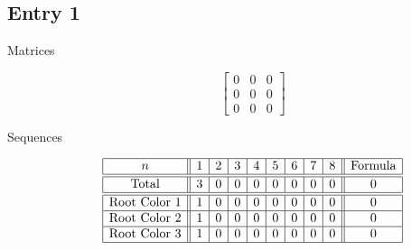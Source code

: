 \documentclass[12pt]{amsart}
\begin{document}
\subsection*{Entry 1}
\begin{description}
    \item[Matrices]
    
    \[\begin{bmatrix}
0 & 0 & 0 \\
0 & 0 & 0 \\
0 & 0 & 0
\end{bmatrix}\]
    \item[Sequences]\hspace*{\fill}\vspace{-0.5cm}
    \begin{center}
        \[
        \begin{array}{|c||c|c|c|c|c|c|c|c||c|}\hline
           n  & 1 & 2 & 3 & 4 & 5 & 6 & 7 & 8  & \text{Formula}\\\hline\hline
           \text{Total}  & 3 & 0 & 0 & 0 & 0 & 0 & 0 & 0 & 0\\\hline\hline
           \text{Root Color }1 & 1 & 0 & 0 & 0 & 0 & 0 & 0 & 0 & 0\\\hline
           \text{Root Color }2 & 1 & 0 & 0 & 0 & 0 & 0 & 0 & 0 & 0\\\hline
           \text{Root Color }3 & 1 & 0 & 0 & 0 & 0 & 0 & 0 & 0 & 0\\\hline
        \end{array}
        \]
    \end{center}
    
    
    
\end{description}
\end{document}
